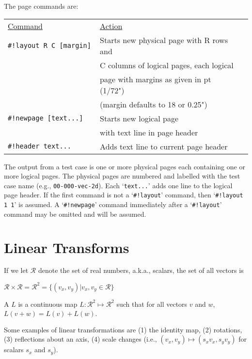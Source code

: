 \documentclass[12pt]{article}
\begin{document}
\begin{minipage}{\textwidth}
The page commands are:
\\[1ex]
\begin{tabular}{@{}l@{~~~~~}l@{~~~~~}l@{}}
\underline{Command} & \underline{Action}
\\[1ex]
\tt \#!layout R C [margin]   & Starts new physical page with R rows and \\
                             & C columns of logical pages, each logical \\
			     & page with margins as given in pt (1/72") \\
			     & (margin defaults to 18 or 0.25") \\
\tt \#!newpage [text...] & Starts new logical page \\
                         & with text line in page header \\
\tt \#!header text... & Adds text line to current page header \\
\end{tabular}
\end{minipage}

The output from a test case is one or more physical pages
each containing one or more logical pages.  The physical
pages are numbered and labelled with the test case name
(e.g., {\tt 00-000-vec-2d}).  Each `{\tt text...}' adds one
line to the logical page header.  If the first command is
not a `{\tt \#!layout}' command, then `{\tt \#!layout 1 1}'
is assumed.  A `{\tt \#!newpage}' command immediately after a
`{\tt \#!layout}' command may be omitted and will be assumed.

\newpage

\section{Linear Transforms}
If we let $\mathcal{R}$ denote the set of real numbers,
a.k.a., scalars, the set of all vectors is \\
\centerline{
$\mathcal{R}\times\mathcal{R}=\mathcal{R}^2
    =\{(v_x,v_y)|v_x,v_y\in \mathcal{R}\}$}

\begin{definition}\label{LINEAR-TRANSFORMATION}
A  $L$ is a continuous map
$L:\mathcal{R}^2\mapsto\mathcal{R}^2$ such that for
all vectors $v$ and $w$, $L(v+w)=L(v)+L(w)$.
\end{definition}

Some examples of linear transformations are (1) the identity map,
(2) rotations, (3) reflections about an axis, (4) scale changes
(i.e., $(v_x,v_y)\longmapsto(s_x v_x,s_y v_y)$ for scalars $s_x$
and $s_y$).
\end{document}
